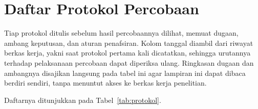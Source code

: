 \section{Daftar Protokol Percobaan}
\label{lamp:protokol}

Tiap protokol ditulis sebelum hasil percobaannya dilihat, memuat dugaan, ambang keputusan, dan aturan penafsiran. Kolom tanggal diambil dari riwayat berkas kerja, yakni saat protokol pertama kali dicatatkan, sehingga urutannya terhadap pelaksanaan percobaan dapat diperiksa ulang. Ringkasan dugaan dan ambangnya disajikan langsung pada tabel ini agar lampiran ini dapat dibaca berdiri sendiri, tanpa menuntut akses ke berkas kerja penelitian.

Daftarnya ditunjukkan pada Tabel~\ref{tab:protokol}.


